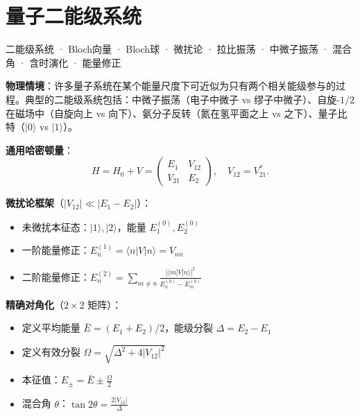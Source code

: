 
\section{量子二能级系统}
\label{sec:two-level-system}

\begin{tipbox}[关键词标签]
二能级系统 · Bloch向量 · Bloch球 · 微扰论 · 拉比振荡 · 中微子振荡 · 混合角 · 含时演化 · 能量修正
\end{tipbox}

\begin{modelbox}[模型：$H_0$ 本征基下的二能级系统]
\textbf{物理情境}：许多量子系统在某个能量尺度下可近似为只有两个相关能级参与的过程。典型的二能级系统包括：中微子振荡（电子中微子 vs 缪子中微子）、自旋-$1/2$ 在磁场中（自旋向上 vs 向下）、氨分子反转（氮在氢平面之上 vs 之下）、量子比特（$|0\rangle$ vs $|1\rangle$）。

\textbf{通用哈密顿量}：
\[
H=H_0+V=\begin{pmatrix}E_1&V_{12}\\V_{21}&E_2\end{pmatrix},
\quad V_{12}=V_{21}^*.
\]

\textbf{微扰论框架}（$|V_{12}|\ll|E_1-E_2|$）：
\begin{itemize}[nosep]
    \item 未微扰本征态：$|1\rangle,|2\rangle$，能量 $E_1^{(0)},E_2^{(0)}$
    \item 一阶能量修正：$E_n^{(1)}=\langle n|V|n\rangle=V_{nn}$
    \item 二阶能量修正：$E_n^{(2)}=\sum_{m\neq n}\frac{|\langle m|V|n\rangle|^2}{E_n^{(0)}-E_m^{(0)}}$
\end{itemize}

\textbf{精确对角化}（$2\times2$ 矩阵）：
\begin{itemize}[nosep]
    \item 定义平均能量 $\bar{E}=(E_1+E_2)/2$，能级分裂 $\Delta=E_2-E_1$
    \item 定义有效分裂 $\Omega=\sqrt{\Delta^2+4|V_{12}|^2}$
    \item 本征值：$E_{\pm}=\bar{E}\pm\frac{\Omega}{2}$
    \item 混合角 $\theta$：$\tan2\theta=\frac{2|V_{12}|}{\Delta}$
\end{itemize}
\end{modelbox}

